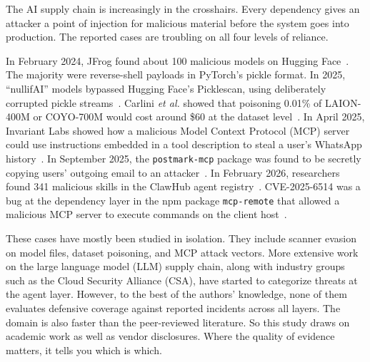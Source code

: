 \documentclass[conference]{IEEEtran}
\begin{document}
The AI supply chain is increasingly in the crosshairs. Every dependency gives an attacker a point of injection for malicious material before the system goes into production. The reported cases are troubling on all four levels of reliance.

In February 2024, JFrog found about 100 malicious models on Hugging Face~\cite{jfrog2024}. The majority were reverse-shell payloads in PyTorch's pickle format. In 2025, ``nullifAI'' models bypassed Hugging Face's Picklescan, using deliberately corrupted pickle streams~\cite{reversinglabs2025}. Carlini \textit{et al.} showed that poisoning 0.01\% of LAION-400M or COYO-700M would cost around \$60 at the dataset level~\cite{carlini2024}. In April 2025, Invariant Labs showed how a malicious Model Context Protocol (MCP) server could use instructions embedded in a tool description to steal a user's WhatsApp history~\cite{invariant2025}. In September 2025, the \texttt{postmark-mcp} package was found to be secretly copying users' outgoing email to an attacker~\cite{koi2025}. In February 2026, researchers found 341 malicious skills in the ClawHub agent registry~\cite{csa2026}. CVE-2025-6514 was a bug at the dependency layer in the npm package \texttt{mcp-remote} that allowed a malicious MCP server to execute commands on the client host~\cite{nvd2025}.

These cases have mostly been studied in isolation. They include scanner evasion on model files, dataset poisoning, and MCP attack vectors. More extensive work on the large language model (LLM) supply chain, along with industry groups such as the Cloud Security Alliance (CSA), have started to categorize threats at the agent layer. However, to the best of the authors' knowledge, none of them evaluates defensive coverage against reported incidents across all layers. The domain is also faster than the peer-reviewed literature. So this study draws on academic work as well as vendor disclosures. Where the quality of evidence matters, it tells you which is which.
\end{document}
